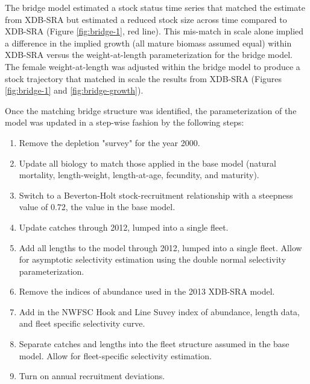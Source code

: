 \documentclass[11pt,
  english,
  a4paper,
]{article}
\begin{document}
\leavevmode\tagmcend\tagstructend\par


The bridge model estimated a stock status time series that matched the estimate from XDB-SRA but estimated a reduced stock size across time compared to XDB-SRA (Figure \ref{fig:bridge-1}, red line). This mis-match in scale alone implied a difference in the implied growth (all mature biomass assumed equal) within XDB-SRA versus the weight-at-length parameterization for the bridge model. The female weight-at-length was adjusted within the bridge model to produce a stock trajectory that matched in scale the results from XDB-SRA (Figures \ref{fig:bridge-1} and \ref{fig:bridge-growth}).

\leavevmode\tagmcend\tagstructend\par


Once the matching bridge structure was identified, the parameterization of the model was updated in a step-wise fashion by the following steps:

\leavevmode\tagmcend\tagstructend\par

\begin{enumerate}
    \item Remove the depletion "survey" for the year 2000.
    \item Update all biology to match those applied in the base model (natural mortality, length-weight, length-at-age, fecundity, and maturity).
    \item Switch to a Beverton-Holt stock-recruitment relationship with a steepness value of 0.72, the value in the base model.
    \item Update catches through 2012, lumped into a single fleet.
    \item Add all lengths to the model through 2012, lumped into a single fleet. Allow for asymptotic selectivity estimation using the double normal selectivity parameterization. 
    \item Remove the indices of abundance used in the 2013 XDB-SRA model.
    \item Add in the NWFSC Hook and Line Suvey index of abundance, length data, and fleet specific selectivity curve.
    \item Separate catches and lengths into the fleet structure assumed in the base model. Allow for fleet-specific selectivity estimation.  
    \item Turn on annual recruitment deviations.
\end{enumerate}
\end{document}
